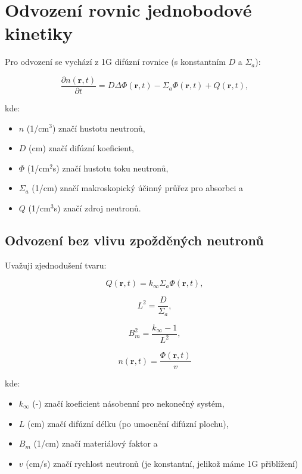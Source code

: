 \section{Odvození rovnic jednobodové kinetiky}

Pro odvození se vychází z 1G difúzní rovnice (s konstantním $D$ a $\Sigma_a$):

\begin{equation}
  \boxed{
  \dfrac{\partial n(\textbf{r}, t)}{\partial t} = D \Delta \Phi (\textbf{r}, t) - \Sigma_a \Phi (\textbf{r}, t) + Q (\textbf{r}, t),
  \label{difuzka}}
\end{equation}

kde:

\begin{itemize}
  \item $n$ (1/cm$^3$) značí hustotu neutronů,
  \item $D$ (cm) značí difúzní koeficient,
  \item $\Phi$ (1/cm$^2$s) značí hustotu toku neutronů,
  \item $\Sigma_a$ (1/cm) značí makroskopický účinný průřez pro absorbci a
  \item $Q$ (1/cm$^3$s) značí zdroj neutronů.
\end{itemize}

\subsection{Odvození bez vlivu zpožděných neutronů}

Uvažuji zjednodušení tvaru:

$$ Q (\textbf{r}, t) = k_\infty \Sigma_a \Phi (\textbf{r}, t), $$

$$ L^2 = \dfrac{D}{\Sigma_a}, $$

$$ B_m^2 = \dfrac{k_\infty - 1}{L^2}, $$

$$ n(\textbf{r}, t) = \dfrac{\Phi (\textbf{r}, t)}{v}$$

kde:

\begin{itemize}
  \item $k_\infty$ (-) značí koeficient násobenní pro nekonečný systém,
  \item $L$ (cm) značí difúzní délku (po umocnění difúzní plochu),
  \item $B_m$ (1/cm) značí materiálový faktor a
  \item $v$ (cm/s) značí rychlost neutronů (je konstantní, jelikož máme 1G přiblížení)
\end{itemize}

